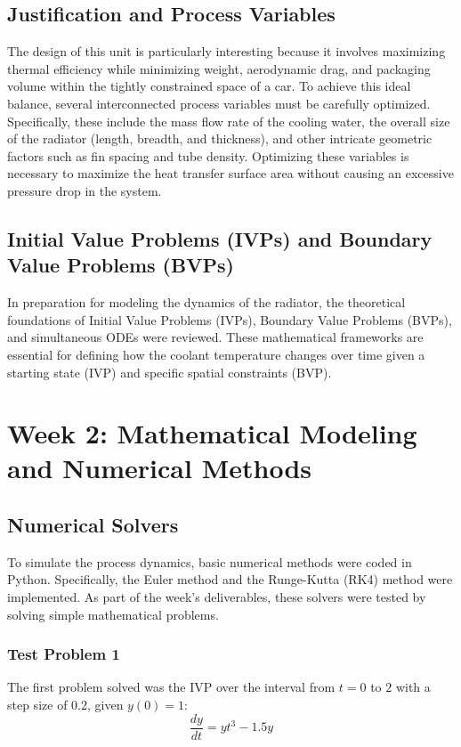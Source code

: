 \documentclass[12pt, a4paper]{article}
\begin{document}
\subsection{Justification and Process Variables}
The design of this unit is particularly interesting because it involves maximizing thermal efficiency while minimizing weight, aerodynamic drag, and packaging volume within the tightly constrained space of a car. To achieve this ideal balance, several interconnected process variables must be carefully optimized. Specifically, these include the mass flow rate of the cooling water, the overall size of the radiator (length, breadth, and thickness), and other intricate geometric factors such as fin spacing and tube density. Optimizing these variables is necessary to maximize the heat transfer surface area without causing an excessive pressure drop in the system.

\subsection{Initial Value Problems (IVPs) and Boundary Value Problems (BVPs)}
In preparation for modeling the dynamics of the radiator, the theoretical foundations of Initial Value Problems (IVPs), Boundary Value Problems (BVPs), and simultaneous ODEs were reviewed. These mathematical frameworks are essential for defining how the coolant temperature changes over time given a starting state (IVP) and specific spatial constraints (BVP).

\section{Week 2: Mathematical Modeling and Numerical Methods}

\subsection{Numerical Solvers}
To simulate the process dynamics, basic numerical methods were coded in Python. Specifically, the Euler method and the Runge-Kutta (RK4) method were implemented. As part of the week's deliverables, these solvers were tested by solving simple mathematical problems.

\subsubsection{Test Problem 1}
The first problem solved was the IVP over the interval from $t = 0$ to $2$ with a step size of $0.2$, given $y(0) = 1$:
\begin{equation}
    \frac{dy}{dt} = y t^3 - 1.5y
\end{equation}
\end{document}
